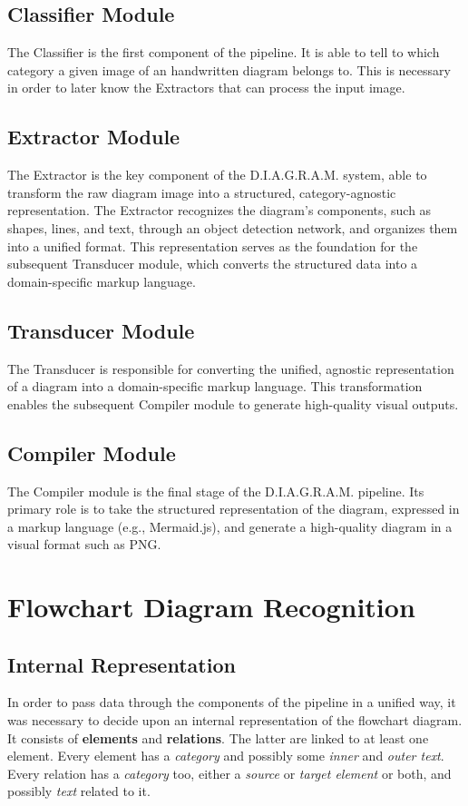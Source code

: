 \documentclass[conference]{IEEEtran}
\begin{document}
\subsection{Classifier Module}
The Classifier is the first component of the pipeline. It is able to tell to which category a given image of an handwritten diagram belongs to. This is necessary in order to later know the Extractors that can process the input image.
\subsection{Extractor Module}
The Extractor is the key component of the D.I.A.G.R.A.M. system, able to transform the raw diagram image into a structured, category-agnostic representation.
The Extractor recognizes the diagram's components, such as shapes, lines, and text, through an object detection network, and organizes them into a unified format. This representation serves as the foundation for the subsequent Transducer module, which converts the structured data into a domain-specific markup language.
\subsection{Transducer Module}
The Transducer is responsible for converting the unified, agnostic representation of a diagram into a domain-specific markup language. 
This transformation enables the subsequent Compiler module to generate high-quality visual outputs.
\subsection{Compiler Module}
The Compiler module is the final stage of the D.I.A.G.R.A.M. pipeline. 
Its primary role is to take the structured representation of the diagram, expressed in a markup language (e.g., Mermaid.js), and generate a high-quality diagram in a visual format such as PNG. 

% 
%
\section{Flowchart Diagram Recognition}

\subsection{Internal Representation}
In order to pass data through the components of the pipeline in a unified way, it was necessary to decide upon an internal representation of the flowchart diagram. It consists of \textbf{elements} and \textbf{relations}. The latter are linked to at least one element. Every element has a \textit{category} and possibly some \textit{inner} and \textit{outer text}. Every relation has a \textit{category} too, either a \textit{source} or \textit{target element} or both, and possibly \textit{text} related to it.
\end{document}
